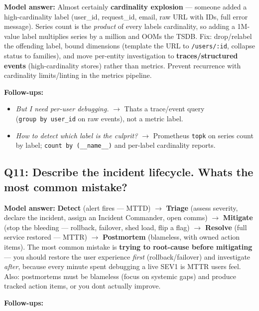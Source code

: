 \documentclass[11pt]{article}
\providecommand{\tightlist}{\setlength{\itemsep}{1pt}\setlength{\parskip}{0pt}}
\begin{document}
\textbf{Model answer:} Almost certainly \textbf{cardinality explosion} --- someone added a high-cardinality label (user\_id, request\_id, email, raw URL with IDs, full error message). Series count is the \emph{product} of every label\textquotesingle s cardinality, so adding a 1M-value label multiplies series by a million and OOMs the TSDB. Fix: drop/relabel the offending label, bound dimensions (template the URL to \texttt{/users/:id}, collapse status to families), and move per-entity investigation to \textbf{traces/structured events} (high-cardinality stores) rather than metrics. Prevent recurrence with cardinality limits/linting in the metrics pipeline.

\textbf{Follow-ups:}

\begin{itemize}
\tightlist
\item
  \emph{But I need per-user debugging.} \(\rightarrow\) That\textquotesingle s a trace/event query (\texttt{group\ by\ user\_id} on raw events), not a metric label.
\item
  \emph{How to detect which label is the culprit?} \(\rightarrow\) Prometheus \texttt{topk} on series count by label; \texttt{count\ by\ (\_\_name\_\_)} and per-label cardinality reports.
\end{itemize}

\subsection{Q11: Describe the incident lifecycle. What\textquotesingle s the most common mistake?}\label{q11-describe-the-incident-lifecycle-whats-the-most-common-mistake}

\textbf{Model answer:} \textbf{Detect} (alert fires --- MTTD) \(\rightarrow\) \textbf{Triage} (assess severity, declare the incident, assign an Incident Commander, open comms) \(\rightarrow\) \textbf{Mitigate} (stop the bleeding --- rollback, failover, shed load, flip a flag) \(\rightarrow\) \textbf{Resolve} (full service restored --- MTTR) \(\rightarrow\) \textbf{Postmortem} (blameless, with owned action items). The most common mistake is \textbf{trying to root-cause before mitigating} --- you should restore the user experience \emph{first} (rollback/failover) and investigate \emph{after}, because every minute spent debugging a live SEV1 is MTTR users feel. Also: postmortems must be blameless (focus on systemic gaps) and produce tracked action items, or you don\textquotesingle t actually improve.

\textbf{Follow-ups:}
\end{document}
